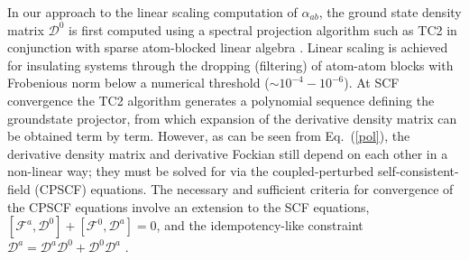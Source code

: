 \documentclass[prl,aps,twocolumn,showpacs,twocolumngrid,superbib]{revtex4}
\begin{document}
In our approach to the linear scaling computation of $\alpha_{ab}$, the ground state 
density matrix $\mathcal{D}^0$ is first computed using a spectral projection algorithm such 
as TC2 \cite{} in conjunction with sparse atom-blocked linear algebra \cite{}.  
Linear scaling is achieved for insulating systems through the dropping (filtering) of atom-atom 
blocks with Frobenious norm below a numerical threshold ($\sim 10^{-4}-10^{-6}$).
At SCF convergence the TC2 algorithm generates a polynomial sequence defining the groundstate projector, 
from which expansion of the derivative density matrix can be obtained term by term.
However, as can be seen from Eq.~(\ref{pol}), the derivative density matrix and derivative Fockian still depend 
on each other in a non-linear way; they must be solved for via the coupled-perturbed 
self-consistent-field (CPSCF) equations. The necessary and sufficient 
criteria for convergence of the CPSCF equations involve an extension to the SCF equations, 
$[\mathcal{F}^{a},\mathcal{D}^{0}]+[\mathcal{F}^{0},\mathcal{D}^{a}]=0$,
and the idempotency-like constraint
$\mathcal{D}^{a}=\mathcal{D}^{a} \mathcal{D}^{0}+\mathcal{D}^{0} \mathcal{D}^{a}$ \cite{Furche_2001}.
\end{document}
